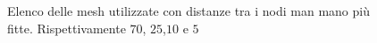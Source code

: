 \begin{landscape}
\begin{figure}[htp]
\caption{Elenco delle mesh utilizzate con distanze tra i nodi man mano più fitte. Rispettivamente $70$, $25$,$10$ e $5$}
\label{fig:Mesh}
\end{figure}
\end{landscape}
